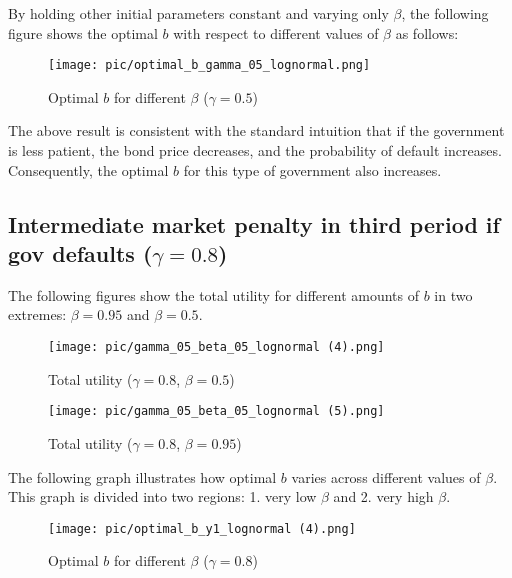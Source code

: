 \documentclass{article}
\begin{document}
By holding other initial parameters constant and varying only $\beta$, the following figure shows the optimal $b$ with respect to different values of $\beta$ as follows:

\begin{figure}[H]
\centering
{\texttt{[image: pic/optimal\_b\_gamma\_05\_lognormal.png]}}
\caption{Optimal $b$ for different $\beta$ ($\gamma = 0.5$)}
\end{figure}

The above result is consistent with the standard intuition that if the government is less patient, the bond price decreases, and the probability of default increases. Consequently, the optimal $b$ for this type of government also increases. 

\subsection{Intermediate market penalty in third period if gov defaults ($\gamma = 0.8$)}

The following figures show the total utility for different amounts of $b$ in two extremes: $\beta = 0.95$ and $\beta = 0.5$.

\begin{figure}[H]
    \centering
    \begin{minipage}{0.5\textwidth}
        \centering
        \texttt{[image: pic/gamma\_05\_beta\_05\_lognormal (4).png]}
        \caption{Total utility ($\gamma = 0.8$, $\beta = 0.5$)}
        \label{fig:gamma05beta05}
    \end{minipage}\hfill
    \begin{minipage}{0.5\textwidth}
        \centering
        \texttt{[image: pic/gamma\_05\_beta\_05\_lognormal (5).png]}
        \caption{Total utility ($\gamma = 0.8$, $\beta = 0.95$)}
        \label{fig:gamma05beta095}
    \end{minipage}
\end{figure}

The following graph illustrates how optimal $b$ varies across different values of $\beta$. This graph is divided into two regions: 1. very low $\beta$ and 2. very high $\beta$. 

\begin{figure}[H]
\centering
{\texttt{[image: pic/optimal\_b\_y1\_lognormal (4).png]}}
\caption{Optimal $b$ for different $\beta$ ($\gamma = 0.8$)}
\label{fig:Simulation1}
\end{figure}
\end{document}
